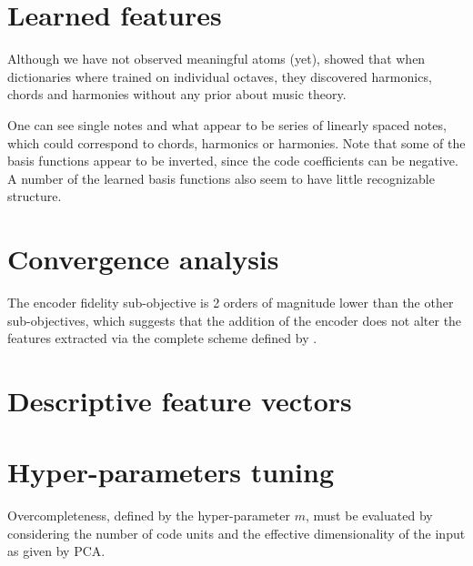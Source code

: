 \section{Learned features}

Although we have not observed meaningful atoms (yet), \cite{lecun2010PSD} showed that when dictionaries where trained on individual octaves, they discovered harmonics, chords and harmonies without any prior about music theory.

One can see single notes and what appear to be series of linearly
spaced notes, which could correspond to chords, harmonics
or harmonies. Note that some of the basis functions appear
to be inverted, since the code coefficients can be negative.
A number of the learned basis functions also seem to have
little recognizable structure.


\section{Convergence analysis}

The encoder fidelity sub-objective is 2 orders of magnitude lower than the other sub-objectives, which suggests that the addition of the encoder does not alter the features extracted via the complete scheme defined by .

\section{Descriptive feature vectors}

\section{Hyper-parameters tuning}

Overcompleteness, defined by the hyper-parameter $m$, must be evaluated by considering the number of code units and the effective dimensionality of the input as given by \gls{PCA}.

